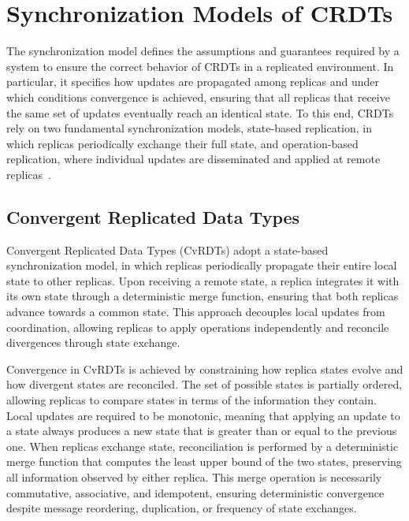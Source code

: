 \section{Synchronization Models of CRDTs}
\label{sec:sync_models}

The synchronization model defines the assumptions and guarantees required by a system to ensure the correct behavior of CRDTs in a replicated environment. In particular, it specifies how updates are propagated among replicas and under which conditions convergence is achieved, ensuring that all replicas that receive the same set of updates eventually reach an identical state. To this end, CRDTs rely on two fundamental synchronization models, state-based replication, in which replicas periodically exchange their full state, and operation-based replication, where individual updates are disseminated and applied at remote replicas~\cite{shapiro2011comprehensive}.

\subsection{Convergent Replicated Data Types}
\label{sub:cvrdts}

Convergent Replicated Data Types (CvRDTs) adopt a state-based synchronization model, in which replicas periodically propagate their entire local state to other replicas. Upon receiving a remote state, a replica integrates it with its own state through a deterministic merge function, ensuring that both replicas advance towards a common state. This approach decouples local updates from coordination, allowing replicas to apply operations independently and reconcile divergences through state exchange.

Convergence in CvRDTs is achieved by constraining how replica states evolve and how divergent states are reconciled. The set of possible states is partially ordered, allowing replicas to compare states in terms of the information they contain. Local updates are required to be monotonic, meaning that applying an update to a state always produces a new state that is greater than or equal to the previous one. When replicas exchange state, reconciliation is performed by a deterministic merge function that computes the least upper bound of the two states, preserving all information observed by either replica. This merge operation is necessarily commutative, associative, and idempotent, ensuring deterministic convergence despite message reordering, duplication, or frequency of state exchanges.

